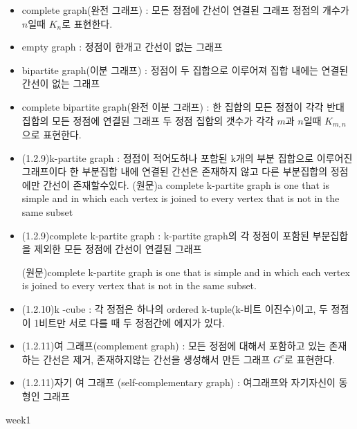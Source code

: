\documentclass{oblivoir}
\begin{document}
    \begin{dfn}
        \begin{itemize}
            \item complete graph(완전 그래프) : 모든 정점에 간선이 연결된 그래프 정점의 개수가 $n$일때 $K_n$로 표현한다.
            \item empty graph : 정점이 한개고 간선이 없는 그래프
            \item bipartite graph(이분 그래프) : 정점이 두 집합으로 이루어져 집합 내에는 연결된 간선이 없는 그래프
            \item complete bipartite graph(완전 이분 그래프) : 한 집합의 모든 정점이 각각 반대 집합의 모든 정점에 연결된 그래프 두 정점 집합의 갯수가 각각 $m$과  $n$일때 $K_{m,n}$으로 표현한다.
            \item (1.2.9)k-partite graph : 정점이 적어도하나 포함된 k개의 부분 집합으로 이루어진 그래프이다  한 부분집합 내에 연결된 간선은 존재하지 않고 다른 부분집합의 정점에만 간선이 존재할수있다.
            (원문)a complete k-partite graph is one that is simple and in which each vertex is
            joined to every vertex that is not in the same subset
            \item (1.2.9)complete k-partite graph : k-partite graph의 각 정점이 포함된 부분집합을 제외한 모든 정점에 간선이 연결된 그래프 
            
            (원문)complete k-partite graph is one that is simple and in which each vertex is
            joined to every vertex that is not in the same subset.

            \item (1.2.10)k -cube : 각 정점은 하나의 ordered k-tuple(k-비트 이진수)이고, 두 정점이 1비트만 서로 다를 때 두 정점간에 에지가 있다.
            \item (1.2.11)여 그래프(complement graph) : 모든 정점에 대해서 포함하고 있는 존재하는 간선은 제거, 존재하지않는 간선을 생성해서 만든 그래프 
            $G^{c}$로 표현한다.
            \item (1.2.11)자기 여 그래프 (self-complementary graph) : 여그래프와 자기자신이 동형인 그래프
        \end{itemize}
    \end{dfn}

    week1
\end{document}
